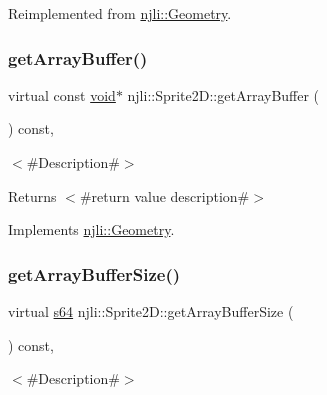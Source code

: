 Reimplemented from \mbox{\hyperlink{classnjli_1_1_geometry_a79efc86c5c96b88d33adfdc3debcddd4}{njli\+::\+Geometry}}.

\mbox{\label{classnjli_1_1_sprite2_d_a7cac9e09519030700347f1b803a3084e}} 
\subsubsection{\texorpdfstring{get\+Array\+Buffer()}{getArrayBuffer()}}
{\footnotesize\ttfamily virtual const \mbox{\hyperlink{_thread_8h_af1e856da2e658414cb2456cb6f7ebc66}{void}}$\ast$ njli\+::\+Sprite2\+D\+::get\+Array\+Buffer (\begin{DoxyParamCaption}{ }\end{DoxyParamCaption}) const\hspace{0.3cm}{\ttfamily [protected]}, {\ttfamily [virtual]}}

$<$\#\+Description\#$>$

\begin{DoxyReturn}{Returns}
$<$\#return value description\#$>$ 
\end{DoxyReturn}


Implements \mbox{\hyperlink{classnjli_1_1_geometry_adbf0ae6c38f23779df2b37708e80c24c}{njli\+::\+Geometry}}.

\mbox{\label{classnjli_1_1_sprite2_d_a7ce47c8c15d233418ebc5f012291a2d9}} 
\subsubsection{\texorpdfstring{get\+Array\+Buffer\+Size()}{getArrayBufferSize()}}
{\footnotesize\ttfamily virtual \mbox{\hyperlink{_util_8h_a4258bfb2c3a440d06c4aaa3c2b450dde}{s64}} njli\+::\+Sprite2\+D\+::get\+Array\+Buffer\+Size (\begin{DoxyParamCaption}{ }\end{DoxyParamCaption}) const\hspace{0.3cm}{\ttfamily [protected]}, {\ttfamily [virtual]}}

$<$\#\+Description\#$>$

